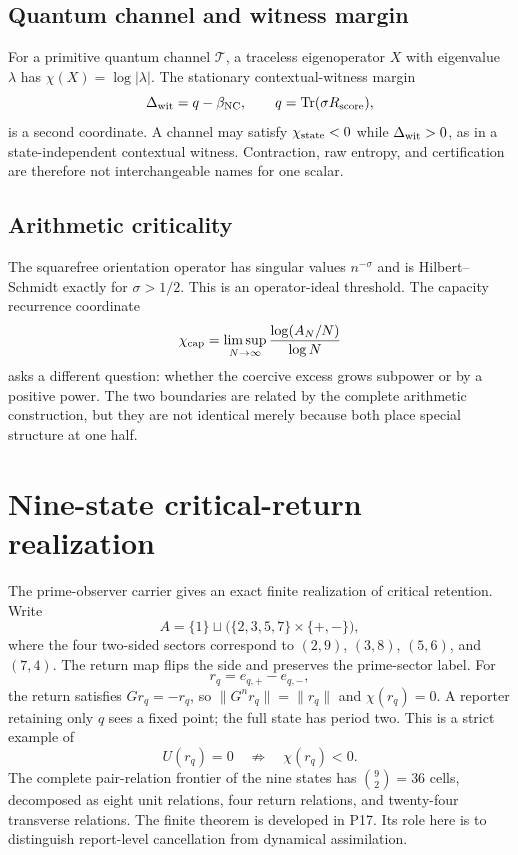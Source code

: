 \documentclass[11pt,a4paper]{article}
\begin{document}
\subsection{Quantum channel and witness margin}
For a primitive quantum channel $\mathcal T$, a traceless eigenoperator $X$ with eigenvalue $\lambda$ has $\chi(X)=\log|\lambda|$. The stationary contextual-witness margin
\begin{equation}
\Delta_{\rm wit}=q-\beta_{\rm NC},\qquad q=\operatorname{Tr}(\sigma R_{\rm score}),
\end{equation}
is a second coordinate. A channel may satisfy $\chi_{\rm state}<0$ while $\Delta_{\rm wit}>0$, as in a state-independent contextual witness. Contraction, raw entropy, and certification are therefore not interchangeable names for one scalar.

\subsection{Arithmetic criticality}
The squarefree orientation operator has singular values $n^{-\sigma}$ and is Hilbert--Schmidt exactly for $\sigma>1/2$. This is an operator-ideal threshold. The capacity recurrence coordinate
\begin{equation}
\chi_{\rm cap}=\limsup_{N\to\infty}\frac{\log(A_N/N)}{\log N}
\end{equation}
asks a different question: whether the coercive excess grows subpower or by a positive power. The two boundaries are related by the complete arithmetic construction, but they are not identical merely because both place special structure at one half.

\section{Nine-state critical-return realization}
The prime-observer carrier gives an exact finite realization of critical retention. Write
\begin{equation}
A=\{1\}\sqcup\bigl(\{2,3,5,7\}\times\{+,-\}\bigr),
\end{equation}
where the four two-sided sectors correspond to $(2,9)$, $(3,8)$, $(5,6)$, and $(7,4)$. The return map flips the side and preserves the prime-sector label. For
\begin{equation}
r_q=e_{q,+}-e_{q,-},
\end{equation}
the return satisfies $Gr_q=-r_q$, so $\|G^nr_q\|=\|r_q\|$ and $\chi(r_q)=0$. A reporter retaining only $q$ sees a fixed point; the full state has period two. This is a strict example of
\begin{equation}
U(r_q)=0\quad\not\Rightarrow\quad\chi(r_q)<0.
\end{equation}
The complete pair-relation frontier of the nine states has $\binom92=36$ cells, decomposed as eight unit relations, four return relations, and twenty-four transverse relations. The finite theorem is developed in P17. Its role here is to distinguish report-level cancellation from dynamical assimilation.
\end{document}
